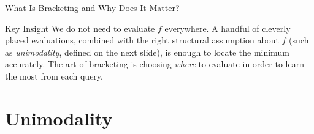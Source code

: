 \documentclass[aspectratio=169,10pt]{beamer}
\begin{document}
\begin{frame}[allowframebreaks]{What Is Bracketing and Why Does It Matter?}
  \begin{alertblock}{Key Insight}
    We do not need to evaluate $f$ everywhere.  A handful of cleverly placed
    evaluations, combined with the right structural assumption about $f$
    (such as \emph{unimodality}, defined on the next slide), is enough to
    locate the minimum accurately.  The art of bracketing is choosing
    \emph{where} to evaluate in order to learn the most from each query.
  \end{alertblock}

\end{frame}

\section{Unimodality}
\end{document}
